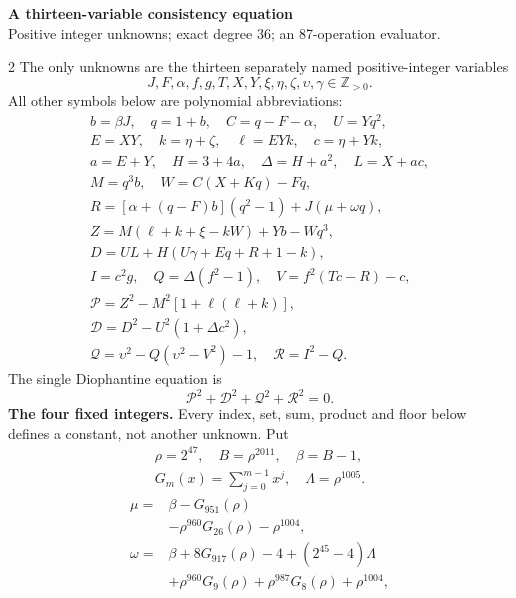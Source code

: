 \documentclass[10pt]{article}
\begin{document}
\begin{center}
{\large\bfseries A thirteen-variable consistency equation}\\[-1pt]
{\small Positive integer unknowns; exact degree 36; an 87-operation evaluator.}
\end{center}\vspace{-8pt}
\begin{multicols}{2}
\fontsize{8.6}{9.1}\selectfont
The only unknowns are the thirteen separately named positive-integer variables
\[
J,F,\alpha,f,g,T,X,Y,\xi,\eta,\zeta,\upsilon,\gamma\in\mathbb Z_{>0}.
\]
All other symbols below are polynomial abbreviations:
\[
\begin{gathered}
b=\beta J,\quad q=1+b,\quad C=q-F-\alpha,\quad U=Yq^2,\\
E=XY,\quad k=\eta+\zeta,\quad \ell=EYk,\quad c=\eta+Yk,\\
a=E+Y,\quad H=3+4a,\quad\Delta=H+a^2,\quad L=X+ac,\\
M=q^3b,\quad W=C(X+Kq)-Fq,\\
R=[\alpha+(q-F)b](q^2-1)+J(\mu+\omega q),\\
Z=M(\ell+k+\xi-kW)+Yb-Wq^3,\\
D=UL+H(U\gamma+Eq+R+1-k),\\
I=c^2g,\quad Q=\Delta(f^2-1),\quad V=f^2(Tc-R)-c,\\
\mathcal{P}=Z^2-M^2[1+\ell(\ell+k)],\\
\mathcal{D}=D^2-U^2(1+\Delta c^2),\\
\mathcal{Q}=\upsilon^2-Q(\upsilon^2-V^2)-1,\quad \mathcal{R}=I^2-Q.
\end{gathered}
\]
The single Diophantine equation is
\[
\boxed{\mathcal{P}^2+\mathcal{D}^2+\mathcal{Q}^2+\mathcal{R}^2=0.}
\]
\textbf{The four fixed integers.}
Every index, set, sum, product and floor below defines a constant, not
another unknown. Put
\[
\begin{gathered}
\rho=2^{47},\quad B=\rho^{2011},\quad\beta=B-1,\\
G_m(x)=\sum_{j=0}^{m-1}x^j,\quad
\Lambda=\rho^{1005}.
\end{gathered}
\]
\begin{align*}
\mu={}&\beta-G_{951}(\rho)\\
&-\rho^{960}G_{26}(\rho)-\rho^{1004},\\
\omega={}&\beta+8G_{917}(\rho)-4+(2^{45}-4)\Lambda\\
&+\rho^{960}G_9(\rho)+\rho^{987}G_8(\rho)
  +\rho^{1004},\\

\end{align*}
\end{multicols}
\end{document}

